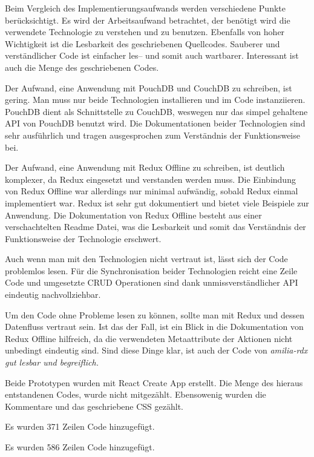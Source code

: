 Beim Vergleich des Implementierungsaufwands werden verschiedene Punkte berücksichtigt.
Es wird der Arbeitsaufwand betrachtet, der benötigt wird die verwendete Technologie zu verstehen und zu benutzen.
Ebenfalls von hoher Wichtigkeit ist die Lesbarkeit des geschriebenen Quellcodes.
Sauberer und verständlicher Code ist einfacher les-- und somit auch wartbarer. Interessant ist auch die Menge des geschriebenen Codes.
%
\begin{description}[leftmargin=0cm,style=nextline]
  \item[amilia-qouch]
  Der Aufwand, eine Anwendung mit PouchDB und CouchDB zu schreiben, ist gering.
  Man muss nur beide Technologien installieren und im Code instanziieren.
  PouchDB dient als Schnittstelle zu CouchDB, weswegen nur das simpel gehaltene \gls{API} von PouchDB benutzt wird.
  Die Dokumentationen beider Technologien sind sehr ausführlich und tragen ausgesprochen zum Verständnis der Funktionsweise bei.

  \item[amilia-rdx]
  Der Aufwand, eine Anwendung mit Redux Offline zu schreiben, ist deutlich komplexer, da Redux eingesetzt und verstanden werden muss.
  Die Einbindung von Redux Offline war allerdings nur minimal aufwändig, sobald Redux einmal implementiert war.
  Redux ist sehr gut dokumentiert und bietet viele Beispiele zur Anwendung.
  Die Dokumentation von Redux Offline besteht aus einer verschachtelten Readme Datei, was die Lesbarkeit und somit das Verständnis der Funktionsweise der Technologie erschwert.
\end{description}
%
\begin{description}[leftmargin=0cm,style=nextline]
  \item[amilia-qouch]
  Auch wenn man mit den Technologien nicht vertraut ist, lässt sich der Code problemlos lesen.
  Für die Synchronisation beider Technologien reicht eine Zeile Code und umgesetzte \gls{CRUD} Operationen sind dank unmissverständlicher API eindeutig nachvollziehbar.
  \item[amilia-rdx] 
  Um den Code ohne Probleme lesen zu können, sollte man mit Redux und dessen Datenfluss vertraut sein.
  Ist das der Fall, ist ein Blick in die Dokumentation von Redux Offline hilfreich, da die verwendeten Metaattribute der Aktionen nicht unbedingt eindeutig sind.
  Sind diese Dinge klar, ist auch der Code von \it{amilia-rdx} gut lesbar und begreiflich.
\end{description}
%
  Beide Prototypen wurden mit React Create App erstellt.
  Die Menge des hieraus entstandenen Codes, wurde nicht mitgezählt. Ebensowenig wurden die Kommentare und das geschriebene \gls{CSS} gezählt.
\begin{description}[leftmargin=0cm,style=nextline]
    \item[amilia-qouch]
    Es wurden 371 Zeilen Code hinzugefügt.
    \item[amilia-rdx] 
    Es wurden 586 Zeilen Code hinzugefügt.
\end{description}
